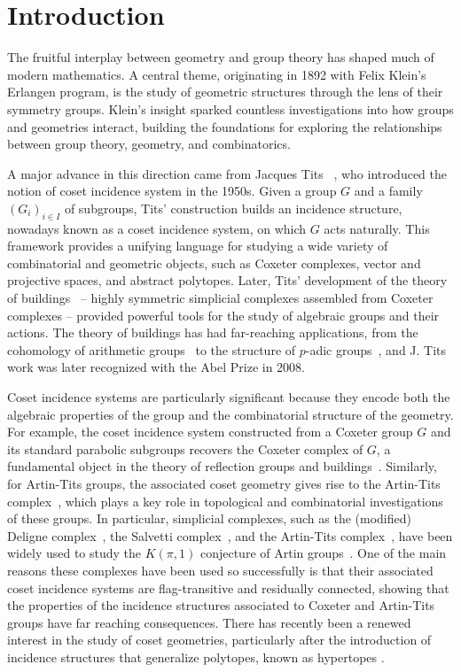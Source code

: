 \documentclass[11pt,letterpaper]{amsart}
\begin{document}

\section{Introduction}

The fruitful interplay between geometry and group theory has shaped much of modern mathematics. A central theme, originating in 1892 with Felix Klein’s Erlangen program, is the study of geometric structures through the lens of their symmetry groups. Klein’s insight sparked countless investigations into how groups and geometries interact, building the foundations for exploring the relationships between group theory, geometry, and combinatorics.

A major advance in this direction came from Jacques Tits ~\cite{Tits1957,Tits1963geometries}, who introduced the notion of coset incidence system in the 1950s.
Given a group $G$ and a family $(G_i)_{i \in I}$ of subgroups, Tits’ construction builds an incidence structure, nowadays known as a coset incidence system, on which $G$ acts naturally. This framework provides a unifying language for studying a wide variety of combinatorial and geometric objects, such as Coxeter complexes, vector and projective spaces, and abstract polytopes. Later, Tits’ development of the theory of buildings~\cite{Handbook,Tits1974} -- highly symmetric simplicial complexes assembled from Coxeter complexes -- provided powerful tools for the study of algebraic groups and their actions. The theory of buildings has had far-reaching applications, from the cohomology of arithmetic groups~\cite{KenBrownBook2,Handbook} to the structure of $p$-adic groups~\cite{IM}, and J. Tits work was later recognized with the Abel Prize in 2008.

Coset incidence systems are particularly significant because they encode both the algebraic properties of the group and the combinatorial structure of the geometry. For example, the coset incidence system constructed from a Coxeter group $G$ and its standard parabolic subgroups recovers the Coxeter complex of $G$, a fundamental object in the theory of reflection groups and buildings~\cite{KenBrownBook2,Tits1974}. 
Similarly, for Artin-Tits groups, the associated coset geometry gives rise to the Artin-Tits complex~\cite{ParisGodelle2012}, which plays a key role in topological and combinatorial investigations of these groups. In particular, simplicial complexes, such as the (modified) Deligne complex~\cite{Charney1995}, the Salvetti complex~\cite{Salvetti_1987}, and the Artin-Tits complex~\cite{ParisGodelle2012}, have been widely used to study the $K(\pi,1)$ conjecture of Artin groups~\cite{paris2014k}. 
One of the main reasons these complexes have been used so successfully is that their associated coset incidence systems are flag-transitive and residually connected, showing that the properties of the incidence structures associated to Coxeter and Artin-Tits groups have far reaching consequences.
There has recently been a renewed interest in the study of coset geometries, particularly after the introduction of incidence structures that generalize polytopes, known as hypertopes \cite{hypertopes, zhang2024abelian, fernandes2018hexagonal,halving,ens2018rank, leemans2025flag,piedade2023infinite}.
\end{document}
